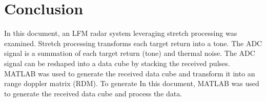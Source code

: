 \documentclass[conference]{IEEEtran}
\begin{document}
\section{Conclusion}
In this document, an LFM radar system leveraging stretch processing was examined. 
Stretch processing transforms each target return into a tone. The ADC signal is a summation of each target return (tone) and thermal noise. The ADC signal can be reshaped into a data cube by stacking the received pulses. MATLAB was used to generate the received data cube and transform it into an range doppler matrix (RDM). To generate  
In this document, MATLAB was used to generate the received data cube and process the data. 
\end{document}
